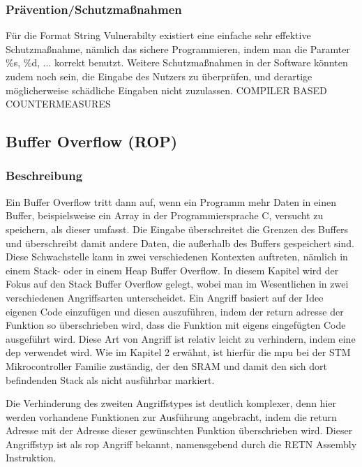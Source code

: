 \documentclass[a4paper,
DIV=13,
12pt,
BCOR=10mm,
department=FakIM,
oneside,
parskip=half,
automark,
listof=totocnumbered,
bibliography=totocnumbered,
acronym=totocnumbered
] {OTHRartcl}
\begin{document}
\subsubsection{Prävention/Schutzmaßnahmen}
Für die Format String Vulnerabilty existiert eine einfache sehr effektive Schutzmaßnahme, nämlich
das sichere Programmieren, indem man die Paramter \%s, \%d, ... korrekt benutzt.
Weitere Schutzmaßnahmen in der Software könnten zudem noch sein, die Eingabe des Nutzers zu überprüfen, und
derartige möglicherweise schädliche Eingaben nicht zuzulassen.
COMPILER BASED COUNTERMEASURES

\subsection{Buffer Overflow (ROP)}
\subsubsection{Beschreibung}
Ein Buffer Overflow tritt dann auf, wenn ein Programm mehr Daten in einen Buffer, beispielsweise ein Array in der Programmiersprache C, versucht zu speichern, als
dieser umfasst.
Die Eingabe überschreitet die Grenzen des Buffers und überschreibt damit andere Daten, die außerhalb des Buffers gespeichert sind.
Diese Schwachstelle kann in zwei verschiedenen Kontexten auftreten, nämlich in einem Stack- oder in einem Heap Buffer Overflow.
In diesem Kapitel wird der Fokus auf den Stack Buffer Overflow gelegt, wobei man im Wesentlichen in zwei verschiedenen Angriffsarten unterscheidet.
Ein Angriff basiert auf der Idee eigenen Code einzufügen und diesen auszuführen, indem der return adresse der Funktion so überschrieben wird, dass die Funktion
mit eigens eingefügten Code ausgeführt wird. Diese Art von Angriff ist relativ leicht zu verhindern, indem eine \ac{dep} verwendet wird.
Wie im Kapitel 2 erwähnt, ist hierfür die \ac*{mpu} bei der STM Mikrocontroller Familie zuständig, der den SRAM und damit den sich dort befindenden Stack als nicht ausführbar markiert.

Die Verhinderung des zweiten Angriffstypes ist deutlich komplexer, denn hier werden vorhandene Funktionen zur Ausführung angebracht, indem die return Adresse mit der Adresse
dieser gewünschten Funktion überschrieben wird. Dieser Angriffstyp ist als \ac*{rop} Angriff bekannt, namensgebend durch die RETN Assembly Instruktion.
\end{document}
